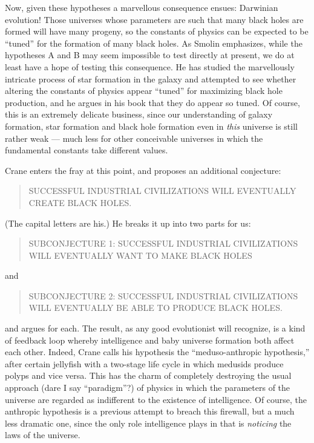 \documentclass{article}
\begin{document}
Now, given these hypotheses a marvellous consequence ensues: Darwinian
evolution! Those universes whose parameters are such that many black
holes are formed will have many progeny, so the constants of physics can
be expected to be ``tuned'' for the formation of many black holes. As
Smolin emphasizes, while the hypotheses A and B may seem impossible to
test directly at present, we do at least have a hope of testing this
consequence. He has studied the marvellously intricate process of star
formation in the galaxy and attempted to see whether altering the
constants of physics appear ``tuned'' for maximizing black hole
production, and he argues in his book that they do appear so tuned. Of
course, this is an extremely delicate business, since our understanding
of galaxy formation, star formation and black hole formation even in
\emph{this} universe is still rather weak --- much less for other
conceivable universes in which the fundamental constants take different
values.

Crane enters the fray at this point, and proposes an additional
conjecture:

\begin{quote}
SUCCESSFUL INDUSTRIAL CIVILIZATIONS WILL EVENTUALLY CREATE BLACK HOLES.
\end{quote}

(The capital letters are his.) He breaks it up into two parts for us:

\begin{quote}
SUBCONJECTURE 1: SUCCESSFUL INDUSTRIAL CIVILIZATIONS WILL EVENTUALLY
WANT TO MAKE BLACK HOLES
\end{quote}

and

\begin{quote}
SUBCONJECTURE 2: SUCCESSFUL INDUSTRIAL CIVILIZATIONS WILL EVENTUALLY BE
ABLE TO PRODUCE BLACK HOLES.
\end{quote}

and argues for each. The result, as any good evolutionist will
recognize, is a kind of feedback loop whereby intelligence and baby
universe formation both affect each other. Indeed, Crane calls his
hypothesis the ``meduso-anthropic hypothesis,'' after certain jellyfish
with a two-stage life cycle in which medusids produce polyps and vice
versa. This has the charm of completely destroying the usual approach
(dare I say ``paradigm''?) of physics in which the parameters of the
universe are regarded as indifferent to the existence of intelligence.
Of course, the anthropic hypothesis is a previous attempt to breach this
firewall, but a much less dramatic one, since the only role intelligence
plays in that is \emph{noticing} the laws of the universe.
\end{document}
